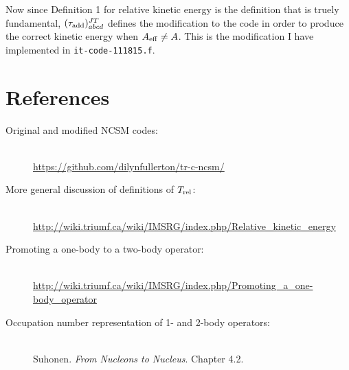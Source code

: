 \documentclass{article}
\begin{document}
Now since Definition 1 for relative kinetic energy is the definition
that is truely fundamental, $(\tau_{\rm{add}})_{abcd}^{JT}$ defines
the modification to the code in order to produce the correct
kinetic energy when $A_{\rm{eff}}\neq A$.
This is the modification I have implemented in
\texttt{it-code-111815.f}.

\section{References}

\begin{description}
\item[Original and modified NCSM codes:]\hfill\\
  \url{https://github.com/dilynfullerton/tr-c-ncsm/}
\item[More general discussion of definitions of $T_{\rm{rel}}$:]\hfill\\
  \url{http://wiki.triumf.ca/wiki/IMSRG/index.php/Relative_kinetic_energy}
\item[Promoting a one-body to a two-body operator:]\hfill\\
  \url{http://wiki.triumf.ca/wiki/IMSRG/index.php/Promoting_a_one-body_operator}
\item[Occupation number representation of 1- and 2-body operators:]\hfill\\
  Suhonen. \textit{From Nucleons to Nucleus}. Chapter 4.2.
  
\end{description}
\end{document}
